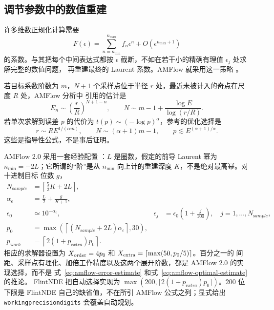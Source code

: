 \documentclass[11pt,a4paper]{ctexart}
\newcommand{\eps}{\epsilon}
\renewcommand{\_}{\origunderscore\allowbreak}
\begin{document}
\subsection{调节参数中的数值重建}
\label{sec:regulator-reconstruction}
\label{subsec:reconstruction-details}

许多维数正规化计算需要
\begin{equation}
  F(\eps)=\sum_{n=n_{\min}}^{n_{\max}}f_n\eps^n+O(\eps^{n_{\max}+1})
\end{equation}
的系数。与其把每个中间表达式都按 $\eps$ 截断，不如在若干小的精确有理值 $\eps_j$ 处求解完整的数值问题，
再重建最终的 Laurent 系数。AMFlow 就采用这一策略 \cite{Liu:2022chg}。

若目标系数阶数为 $m$，$N+1$ 个采样点位于半径 $r$ 处，最近未被计入的奇点在尺度 $R$ 处，AMFlow 分析中
引用的估计是
\begin{equation}
  E_n\sim\left(\frac rR\right)^{N+1-n},
  \qquad
  N\sim m-1+\frac{\log E}{\log(r/R)}.
  \label{eq:amflow-error-estimate}
\end{equation}
若单次求解到误差 $p$ 的代价为 $t(p)\sim(-\log p)^\alpha$，参考的优化选择是
\begin{equation}
  r\sim R E^{1/(\alpha m)},
  \qquad N\sim(\alpha+1)m-1,
  \qquad p\lesssim E^{(\alpha+1)/\alpha}.
  \label{eq:amflow-optimal-estimate}
\end{equation}
这些是指导性公式，不是事后证明。

AMFlow 2.0 采用一套经验配置 \cite{Huang:2026rjb}：$L$ 是圈数，假定的前导 Laurent 幂为
$n_{\min}=-2L$；它所谓的“阶”是从 $n_{\min}$ 向上计的重建深度 $K$，不是绝对最高幂。对十进制目标
位数 $g$，
\begin{align}
  N_{\mathrm sample}&=\left\lceil\frac52K+2L\right\rceil,\\
  \alpha_\eps&=\frac L2+\frac{g}{K+1},\\
  \eps_0&\simeq10^{-\alpha_\eps},
  &\eps_j&=\eps_0\left(1+\frac{j}{100}\right),\quad j=1,\ldots,N_{\mathrm sample},\\
  p_0&=\max\left(\left\lceil(N_{\mathrm sample}+2L)\alpha_\eps\right\rceil,30\right),\\
  p_{\mathrm work}&=\left\lceil2(1+p_{\mathrm extra})p_0\right\rceil.
  \label{eq:amflow-default-config}
\end{align}
相应的求解器设置为 $X_{\rm order}=4p_0$ 和 $X_{\rm extra}=\lceil\max(50,p_0/5)\rceil$。百分之一的
间距、采样点有理化、加倍工作精度以及这两个展开阶数，都是 AMFlow 2.0 的实现选择，而不是
式~\eqref{eq:amflow-error-estimate} 和式~\eqref{eq:amflow-optimal-estimate} 的推论。
FlintNDE 把自动选择实现为 $\max(200,\lceil2(1+p_{\mathrm extra})p_0\rceil)$。200 位下限是 FlintNDE
自己的缺省值，不在所引 AMFlow 公式之列；显式给出 \texttt{working\_precision\_digits} 会覆盖自动规划。
\end{document}
